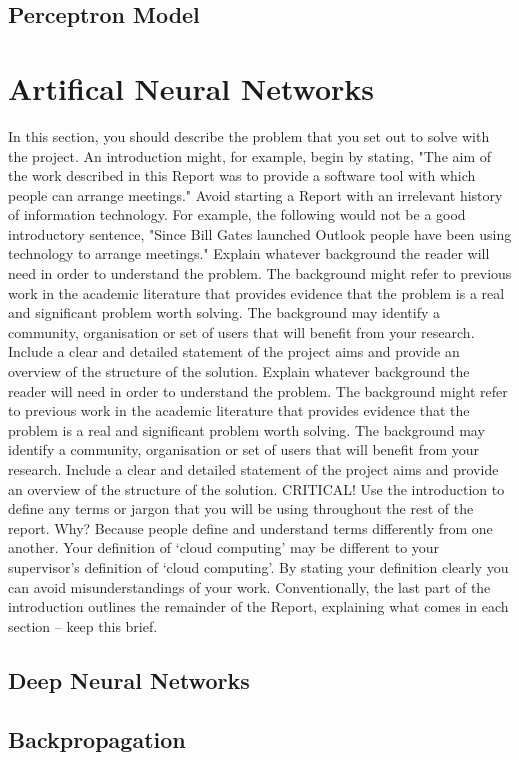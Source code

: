 \subsection{Perceptron Model}
\pagebreak
\section{Artifical Neural Networks}
In this section, you should describe the problem that you set out to solve with the project. An introduction might, for example, begin by stating, "The aim of the work described in this Report was to provide a software tool with which people can arrange meetings." Avoid starting a Report with an irrelevant history of information technology. For example, the following would not be a good introductory sentence, "Since Bill Gates launched Outlook people have been using technology to arrange meetings."
Explain whatever background the reader will need in order to understand the problem. The background might refer to previous work in the academic literature that provides evidence that the problem is a real and significant problem worth solving. The background may identify a community, organisation or set of users that will benefit from your research. Include a clear and detailed statement of the project aims and provide an overview of the structure of the solution.
Explain whatever background the reader will need in order to understand the problem. The background might refer to previous work in the academic literature that provides evidence that the problem is a real and significant problem worth solving. The background may identify a community, organisation or set of users that will benefit from your research. Include a clear and detailed statement of the project aims and provide an overview of the structure of the solution.
CRITICAL! Use the introduction to define any terms or jargon that you will be using throughout the rest of the report.  Why?  Because people define and understand terms differently from one another.  Your definition of ‘cloud computing’ may be different to your supervisor’s definition of ‘cloud computing’.  By stating your definition clearly you can avoid misunderstandings of your work.
Conventionally, the last part of the introduction outlines the remainder of the Report, explaining what comes in each section – keep this brief.

\subsection{Deep Neural Networks}


\subsection{Backpropagation}
